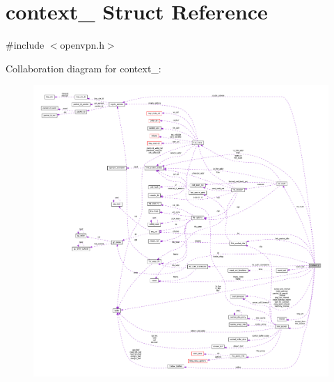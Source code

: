 \hypertarget{structcontext__2}{}\section{context\+\_ Struct Reference}
\label{structcontext__2}


{\ttfamily \#include $<$openvpn.\+h$>$}



Collaboration diagram for context\+\_\+:
\nopagebreak
\begin{figure}[H]
\begin{center}
\leavevmode
\includegraphics[width=350pt]{structcontext__2__coll__graph}
\end{center}
\end{figure}
